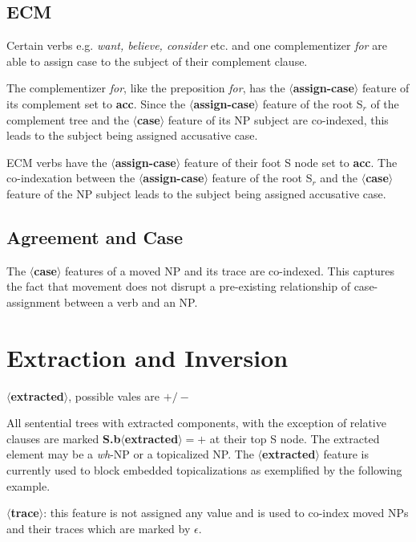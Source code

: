 \subsection{ECM}
Certain verbs e.g. {\em want, believe, consider} etc. and one complementizer
{\em for} are able to assign case to the subject of their complement clause. 

The complementizer {\em for}, like the preposition {\em for}, has the
{\bf $\langle$assign-case$\rangle$} feature of its complement set to
{\bf acc}. Since the {\bf $\langle$assign-case$\rangle$} feature of
the root S$_{r}$ of the complement tree and the {\bf
$\langle$case$\rangle$} feature of its NP subject are co-indexed, this
leads to the subject being assigned accusative case.

ECM verbs have the {\bf $\langle$assign-case$\rangle$}  feature of their
foot S node set to {\bf acc}. The co-indexation between the 
{\bf $\langle$assign-case$\rangle$} feature of
the root S$_{r}$ and the {\bf $\langle$case$\rangle$} feature of the NP subject
leads to the subject being assigned accusative case.

\subsection{Agreement and Case}
The {\bf $\langle$case$\rangle$} features of a moved NP and its trace 
are co-indexed. This captures the fact that movement does not disrupt 
a pre-existing relationship of case-assignment between a verb and an NP.



\section{Extraction and Inversion}
{\bf $\langle$extracted$\rangle$}, possible vales are {\bf $+/-$}

All sentential trees with extracted components, with the exception of
relative clauses are marked {\bf S.b$\langle$extracted$\rangle = +$}
at their top S node. The extracted element may be a {\em wh}-NP or a
topicalized NP. The {\bf $\langle$extracted$\rangle$} feature 
is currently used to block embedded topicalizations as exemplified
by the following example.

\noindent
{\bf $\langle$trace$\rangle$}: this feature is not assigned any value and
is used to co-index moved NPs and their traces which are marked by
$\epsilon$.

